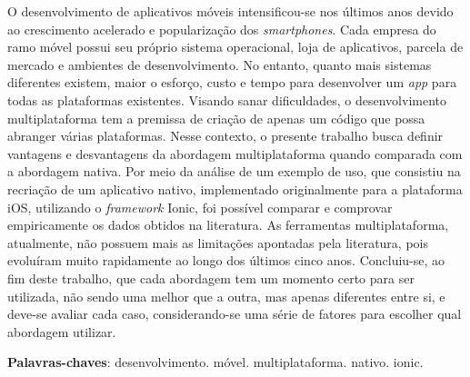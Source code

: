 \begin{resumo}

 O desenvolvimento de aplicativos móveis intensificou-se nos últimos anos devido ao crescimento acelerado e popularização dos \textit{smartphones}. Cada empresa
 do ramo móvel possui seu próprio sistema operacional, loja de aplicativos, parcela de mercado e ambientes de desenvolvimento. No entanto, quanto mais 
 sistemas diferentes existem, maior o esforço, custo e tempo para desenvolver um \textit{app} para todas as plataformas existentes. Visando sanar dificuldades, o desenvolvimento multiplataforma tem a premissa de criação de apenas um código que possa abranger várias plataformas. Nesse contexto, o presente trabalho busca definir vantagens e desvantagens da abordagem
 multiplataforma quando comparada com a abordagem nativa. Por meio da análise de um exemplo de uso, que consistiu na recriação de um aplicativo nativo, implementado originalmente para a plataforma iOS,
 utilizando o \textit{framework} Ionic, foi possível comparar e comprovar empiricamente os dados obtidos na literatura. As ferramentas multiplataforma, atualmente,
 não possuem mais as limitações apontadas pela literatura, pois evoluíram muito rapidamente ao longo dos últimos cinco anos. Concluiu-se, ao fim deste trabalho, que cada abordagem tem um momento certo
 para ser utilizada, não sendo uma melhor que a outra, mas apenas diferentes entre si, e deve-se avaliar cada caso, considerando-se uma série de fatores para escolher qual abordagem utilizar.

 \vspace{\onelineskip}
    
 \noindent
 \textbf{Palavras-chaves}: desenvolvimento. móvel. multiplataforma. nativo. ionic. 
\end{resumo}
